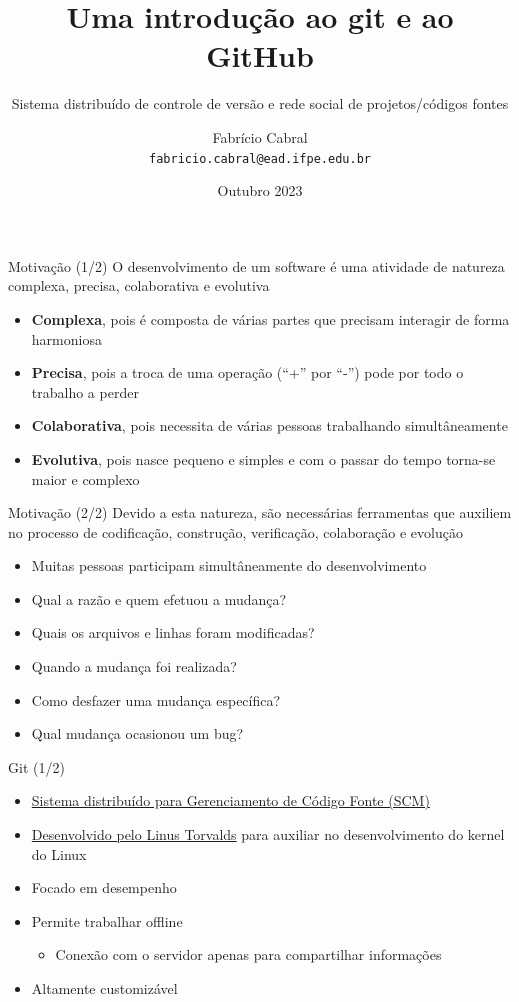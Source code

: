 \documentclass[aspectratio=169,14pt]{beamer}
\title{Uma introdução ao git e ao GitHub}
\subtitle{Sistema distribuído de controle de versão e rede social de 
projetos/códigos fontes}
\date{Outubro 2023}
\author[Fabrício Cabral]{
    Fabrício Cabral\texorpdfstring{\\\texttt{fabricio.cabral@ead.ifpe.edu.br}}{}
}
\institute{IFPE}
\begin{document}
\titlepage

\begin{frame}{Motivação (1/2)}
O desenvolvimento de um software é uma atividade de natureza complexa, precisa,
colaborativa e evolutiva
\begin{itemize}
    \item \textbf{Complexa}, pois é composta de várias partes que precisam
    interagir de forma harmoniosa
    \item \textbf{Precisa}, pois a troca de uma operação (``+'' por ``-'') pode
    por todo o trabalho a perder
    \item \textbf{Colaborativa}, pois necessita de várias pessoas trabalhando
    simultâneamente
    \item \textbf{Evolutiva}, pois nasce pequeno e simples e com o passar do
    tempo torna-se maior e complexo        
\end{itemize}
\end{frame}

\begin{frame}{Motivação (2/2)}
Devido a esta natureza, são necessárias ferramentas que auxiliem no processo de
codificação, construção, verificação, colaboração e evolução
\begin{itemize}
    \item Muitas pessoas participam simultâneamente do desenvolvimento
    \item Qual a razão e quem efetuou a mudança?
    \item Quais os arquivos e linhas foram modificadas?
    \item Quando a mudança foi realizada?
    \item Como desfazer uma mudança específica?
    \item Qual mudança ocasionou um bug?
\end{itemize}
\end{frame}

\begin{frame}{Git (1/2)}
    \begin{itemize}
        \item \href{https://git-scm.com}{Sistema distribuído para Gerenciamento
        de Código Fonte (SCM)}
        \item
        \href{https://www.atlassian.com/git/articles/10-years-of-git}{Desenvolvido
        pelo Linus Torvalds} para auxiliar no desenvolvimento do kernel do Linux
        \item Focado em desempenho
        \item Permite trabalhar offline
        \begin{itemize}
            \item Conexão com o servidor apenas para compartilhar informações
        \end{itemize}
        \item Altamente customizável
    \end{itemize}    
\end{frame}
\end{document}
